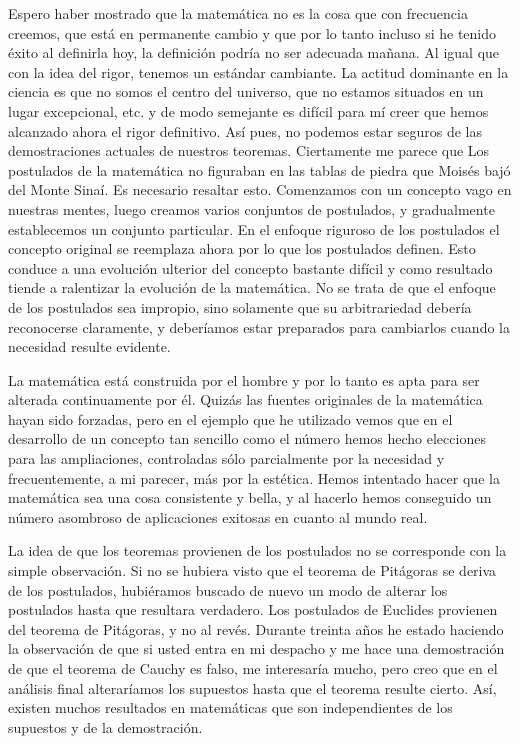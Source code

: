 \documentclass[a4paper, 12pt]{article}
\begin{document}
Espero haber mostrado que la matemática no es la cosa que con frecuencia creemos, que está en permanente cambio y que por lo tanto incluso si he tenido éxito al definirla hoy, la definición podría no ser adecuada mañana. Al igual que con la idea del rigor, tenemos un estándar cambiante. La actitud dominante en la ciencia es que no somos el centro del universo, que no estamos situados en un lugar excepcional, etc. y de modo semejante es difícil para mí creer que hemos alcanzado ahora el rigor definitivo. Así pues, no podemos estar seguros de las demostraciones actuales de nuestros teoremas. Ciertamente me parece que {\sf Los postulados de la matemática no figuraban en las tablas de piedra que Moisés bajó del Monte Sinaí}. Es necesario resaltar esto. Comenzamos con un concepto vago en nuestras mentes, luego creamos varios conjuntos de postulados, y gradualmente establecemos un conjunto particular. En el enfoque riguroso de los postulados el concepto original se reemplaza ahora por lo que los postulados definen. Esto conduce a una evolución ulterior del concepto bastante difícil y como resultado tiende a ralentizar la evolución de la matemática. No se trata de que el enfoque de los postulados sea impropio, sino solamente que su arbitrariedad debería reconocerse claramente, y deberíamos estar preparados para cambiarlos cuando la necesidad resulte evidente.

 

La matemática está construida por el hombre y por lo tanto es apta para ser alterada continuamente por él. Quizás las fuentes originales de la matemática hayan sido forzadas, pero en el ejemplo que he utilizado vemos que en el desarrollo de un concepto tan sencillo como el número hemos hecho elecciones para las ampliaciones, controladas sólo parcialmente por la necesidad y frecuentemente, a mi parecer, más por la estética. Hemos intentado hacer que la matemática sea una cosa consistente y bella, y al hacerlo hemos conseguido un número asombroso de aplicaciones exitosas en cuanto al mundo real.

 

La idea de que los teoremas provienen de los postulados no se corresponde con la simple observación. Si no se hubiera visto que el teorema de Pitágoras se deriva de los postulados, hubiéramos buscado de nuevo un modo de alterar los postulados hasta que resultara verdadero. Los postulados de Euclides provienen del teorema de Pitágoras, y no al revés. Durante treinta años he estado haciendo la observación de que si usted entra en mi despacho y me hace una demostración de que el teorema de Cauchy es falso, me interesaría mucho, pero creo que en el análisis final alteraríamos los supuestos hasta que el teorema resulte cierto. Así, existen muchos resultados en matemáticas que son independientes de los supuestos y de la demostración.
\end{document}
